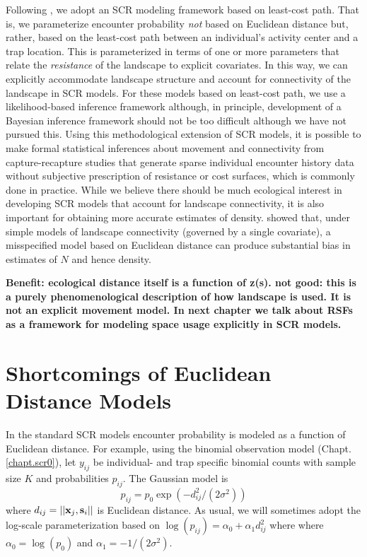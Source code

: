 Following \citet{royle_etal:2012ecol}, we adopt an SCR modeling
framework based on least-cost path. That is, we parameterize encounter
probability {\it not} based on Euclidean distance but, rather, based
on the least-cost path between an individual's activity center and a
trap location. This is parameterized in terms of one or more
parameters that relate the {\it resistance} of the landscape to
explicit covariates.  In this way, we can explicitly accommodate
landscape structure and account for connectivity of the landscape in
SCR models. For these models based on least-cost path, we use a
likelihood-based inference framework although, in principle,
development of a Bayesian inference framework should not be too
difficult although we have not pursued this.  Using this
methodological extension of SCR models, it is possible to make formal
statistical inferences about movement and connectivity from
capture-recapture studies that generate sparse individual encounter
history data without subjective prescription of resistance or cost
surfaces, which is commonly done in practice.  While we believe there
should be much ecological interest in developing SCR models that
account for landscape connectivity, it is also important for obtaining
more accurate estimates of density.  \citet{royle_etal:2012ecol}
showed that, under simple models of landscape connectivity (governed
by a single covariate), a misspecified model based on Euclidean
distance can produce substantial bias in estimates of $N$ and hence
density.

{\bf 
Benefit: ecological distance itself is a function of z(s). not good:
this is a purely phenomenological description of how landscape is
used. It is not an explicit movement model. In next chapter we talk
about RSFs as a framework for modeling space usage explicitly in SCR
models. 
}
\section{Shortcomings of Euclidean Distance Models}


In the standard SCR models  encounter probability is modeled as a function
of Euclidean distance. For example, using the binomial observation model
(Chapt. \ref{chapt.scr0}), let
$y_{ij}$ be individual- and trap specific binomial counts
with sample size $K$ and probabilities
$p_{ij}$. The Gaussian model is
\[
p_{ij} = p_{0} \exp(-  d_{ij}^2 
/(2\sigma^{2}) )
\]
where $d_{ij} = ||{\bf x}_{j}, {\bf s}_{i}||$ is Euclidean
distance. As usual, we will sometimes adopt the
log-scale parameterization based on 
$\log(p_{ij})= \alpha_{0} + \alpha_{1} d_{ij}^{2}$ where
where $\alpha_{0} = \log(p_{0})$ and $\alpha_{1} = -1/(2\sigma^2)$.

